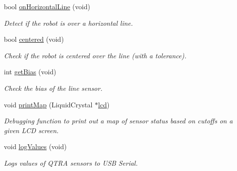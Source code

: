 \begin{DoxyCompactItemize}
bool \hyperlink{class_reflectance_sensor_a30b767c95bec679ff638765050c770e2}{on\+Horizontal\+Line} (void)
\begin{DoxyCompactList}\small\item\em Detect if the robot is over a horizontal line. \end{DoxyCompactList}\item 
bool \hyperlink{class_reflectance_sensor_af24236e10ded862847bb6a626c5cf336}{centered} (void)
\begin{DoxyCompactList}\small\item\em Check if the robot is centered over the line (with a tolerance). \end{DoxyCompactList}\item 
int \hyperlink{class_reflectance_sensor_a1e361d2a9a18b4c9da19bdc4b061a3c7}{get\+Bias} (void)
\begin{DoxyCompactList}\small\item\em Check the bias of the line sensor. \end{DoxyCompactList}\item 
void \hyperlink{class_reflectance_sensor_a065644d5cf3d71d81ea4f91787c2915d}{print\+Map} (Liquid\+Crystal $\ast$\hyperlink{rbe2001_8ino_a4cbb289153633c01a1584b3aa0d9a0a2}{lcd})
\begin{DoxyCompactList}\small\item\em Debugging function to print out a map of sensor status based on cutoffs on a given L\+CD screen. \end{DoxyCompactList}\item 
void \hyperlink{class_reflectance_sensor_a637d9833bd917e331908917fc777ac19}{log\+Values} (void)
\begin{DoxyCompactList}\small\item\em Logs values of Q\+T\+RA sensors to U\+SB Serial. \end{DoxyCompactList}\end{DoxyCompactItemize}
